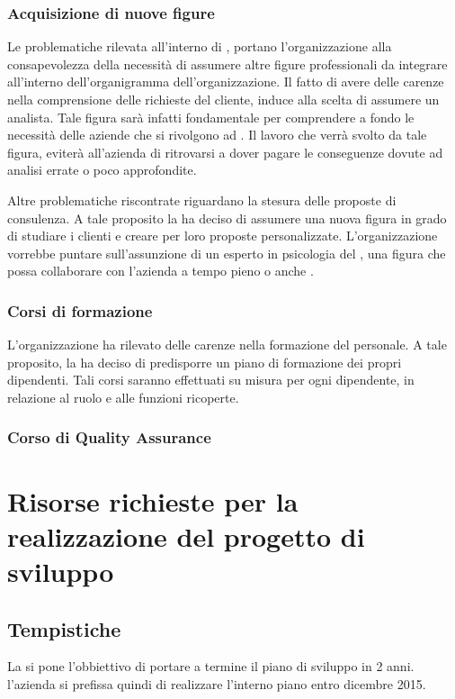 \subsubsection{Acquisizione di nuove figure}
Le problematiche rilevata all'interno di \customer , portano l'organizzazione alla consapevolezza della necessità di assumere altre figure professionali da integrare all'interno dell'organigramma dell'organizzazione.
Il fatto di avere delle carenze nella comprensione delle richieste del cliente, induce \customer alla scelta di assumere un analista. Tale figura sarà infatti fondamentale per comprendere a fondo le necessità delle aziende che si rivolgono ad \customer. Il lavoro che verrà svolto da tale figura, eviterà all'azienda di ritrovarsi a dover pagare le conseguenze dovute ad analisi errate o poco approfondite.

Altre problematiche riscontrate riguardano la stesura delle proposte di consulenza. A tale proposito la \customer ha deciso di assumere una nuova figura in grado di studiare i clienti e creare per loro proposte personalizzate. L'organizzazione vorrebbe puntare sull'assunzione di un esperto in psicologia del \mktg , una figura che possa collaborare con l'azienda a tempo pieno o anche .


\subsubsection{Corsi di formazione} 
L'organizzazione ha rilevato delle carenze nella formazione del personale. A tale proposito, la \customer ha deciso di predisporre un piano di formazione dei propri dipendenti. Tali corsi saranno effettuati su misura per ogni dipendente, in relazione al ruolo e alle funzioni ricoperte. 


\subsubsection{Corso di Quality Assurance}
  
  
  
  
  
\section{Risorse richieste per la realizzazione del progetto di sviluppo}
\subsection{Tempistiche}
La \customer si pone l'obbiettivo di portare a termine il piano di sviluppo in 2 anni. l'azienda si prefissa quindi di realizzare l'interno piano entro dicembre 2015.       
	
